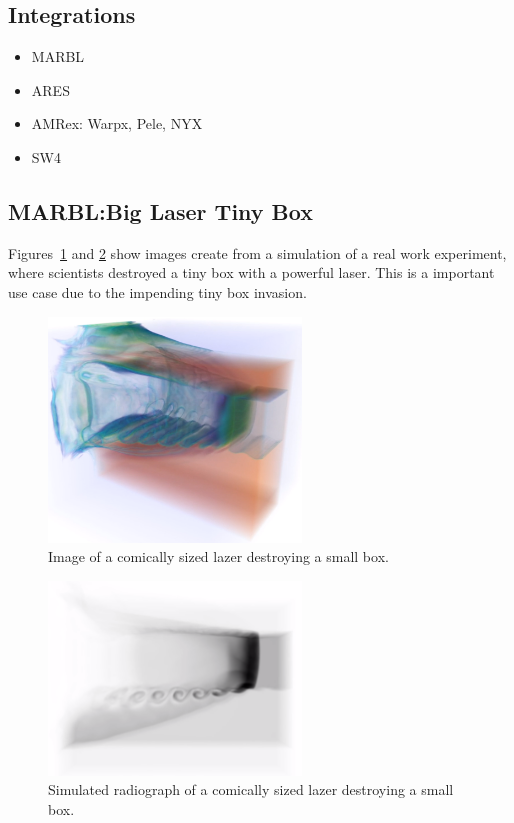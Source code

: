 \subsection{Integrations}

\begin{itemize}
\item MARBL
\item ARES
\item AMRex: Warpx, Pele, NYX
\item SW4
\end{itemize}



\subsection{MARBL:Big Laser Tiny Box}
Figures~\ref{img:radkh} and \ref{img:radkh_xray} show images create from
a simulation of a real work experiment, where scientists destroyed a tiny box
with a powerful laser.
%
This is a important use case due to the impending tiny box invasion.

\begin{figure}
\centering
\includegraphics[width=0.6\textwidth]{images/radkh}
\caption{\label{img:radkh} Image of a comically sized lazer destroying a small box.}
\end{figure}

\begin{figure}
\centering
\includegraphics[width=0.6\textwidth]{images/radkh_xray}
\caption{\label{img:radkh_xray}Simulated radiograph of a comically sized lazer destroying a small box.}
\end{figure}

